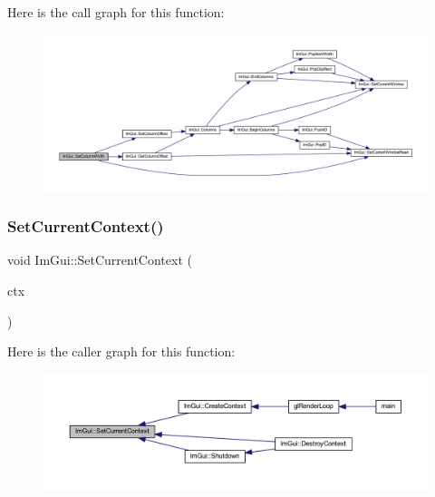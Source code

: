 Here is the call graph for this function\+:
\nopagebreak
\begin{figure}[H]
\begin{center}
\leavevmode
\includegraphics[width=350pt]{namespace_im_gui_af17222ec47aebb5ede00be7b52de9f5d_cgraph}
\end{center}
\end{figure}
\mbox{\label{namespace_im_gui_a289dbbbffdadcf1231821d97a7c4a9be}} 
\subsubsection{\texorpdfstring{Set\+Current\+Context()}{SetCurrentContext()}}
{\footnotesize\ttfamily void Im\+Gui\+::\+Set\+Current\+Context (\begin{DoxyParamCaption}\item[{\mbox{\hyperlink{struct_im_gui_context}{Im\+Gui\+Context}} $\ast$}]{ctx }\end{DoxyParamCaption})}

Here is the caller graph for this function\+:
\nopagebreak
\begin{figure}[H]
\begin{center}
\leavevmode
\includegraphics[width=350pt]{namespace_im_gui_a289dbbbffdadcf1231821d97a7c4a9be_icgraph}
\end{center}
\end{figure}
\mbox{\label{namespace_im_gui_a4f83c0a884e07247a00700d3dd3d01e3}} 
